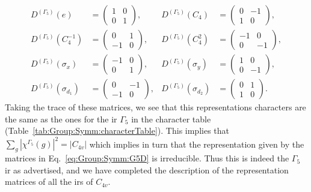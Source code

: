 \begin{subequations}
    \label{eq:Group:Symm:G5D}
\begin{align}
    D^{(\Gamma_5)}(e) &=
    \begin{pmatrix}
        1 & 0\\
        0 & 1
    \end{pmatrix}, & D^{(\Gamma_5)}(C_4) &=
    \begin{pmatrix}
        0 & -1\\
        1 & 0
    \end{pmatrix},\\
    D^{(\Gamma_5)}(C_4^{-1}) &=
    \begin{pmatrix}
        0 & 1\\
        -1 & 0
    \end{pmatrix}, & D^{(\Gamma_5)}(C_4^2) &= 
    \begin{pmatrix}
        -1 & 0\\
        0 & -1
    \end{pmatrix},\\
    D^{(\Gamma_5)}(\sigma_x) &= 
    \begin{pmatrix}
        -1 & 0\\
        0 & 1
    \end{pmatrix}, & D^{(\Gamma_5)}(\sigma_y) &=
    \begin{pmatrix}
        1 & 0\\
        0 & -1
    \end{pmatrix},\\
    D^{(\Gamma_5)}(\sigma_{d_1}) &=
    \begin{pmatrix}
        0 & -1\\
        -1 & 0
    \end{pmatrix}, & D^{(\Gamma_5)}(\sigma_{d_2}) &=
    \begin{pmatrix}
        0 & 1\\
        1 & 0
    \end{pmatrix}.
\end{align}
\end{subequations}
Taking the trace of these matrices, we see that this representations characters are the same as the ones for the \ac{ir} $\Gamma_5$ in the character table
(Table~\ref{tab:Group:Symm:characterTable}). This implies that $\sum_g|\chi^{\Gamma_{5}}(g)|^2 = |C_{4v}|$ which implies in turn that the representation
given by the matrices in Eq.~\eqref{eq:Group:Symm:G5D} is irreducible. Thus this is indeed the $\Gamma_5$ \ac{ir} as advertised,
and we have completed the description of the representation matrices of all the \ac{ir}s of $C_{4v}$.

